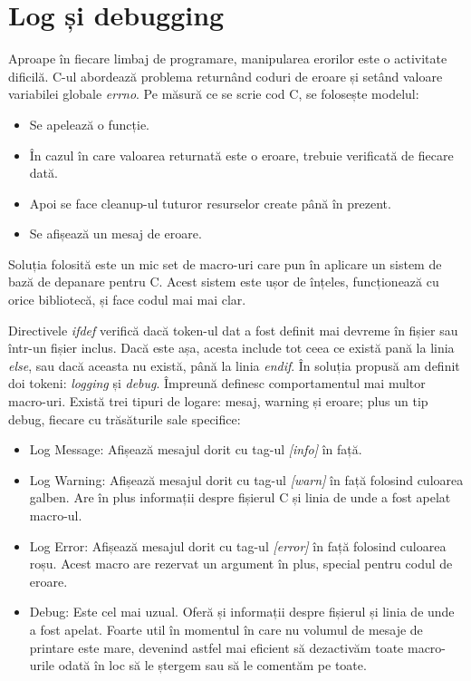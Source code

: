 

\section{Log și debugging}

Aproape în fiecare limbaj de programare, manipularea erorilor este o activitate dificilă. C-ul abordează problema returnând coduri de eroare și setând valoare variabilei globale \textit{errno}. Pe măsură ce se scrie cod C, se folosește modelul:

\begin{itemize}
  \item Se apelează o funcție.
  \item În cazul în care valoarea returnată este o eroare, trebuie verificată de fiecare dată.
  \item Apoi se face cleanup-ul tuturor resurselor create până în prezent.
  \item Se afișează un mesaj de eroare.
\end{itemize}

Soluția folosită este un mic set de macro-uri care pun în aplicare un sistem de bază de depanare pentru C. Acest sistem este ușor de înțeles, funcționează cu orice bibliotecă, și face codul mai mai clar.

Directivele \textit{ifdef} verifică dacă token-ul dat a fost definit mai devreme în fișier sau într-un fișier inclus. Dacă este așa, acesta include tot ceea ce există pană la linia \textit{else}, sau dacă aceasta nu există, până la linia \textit{endif}. În soluția propusă am definit doi tokeni: \textit{logging} și \textit{debug}. Împreună definesc comportamentul mai multor macro-uri. Există trei tipuri de logare: mesaj, warning și eroare; plus un tip debug, fiecare cu trăsăturile sale specifice:

\begin{itemize}
  \item Log Message: Afișează mesajul dorit cu tag-ul \textit{[info]} în față.
  \item Log Warning: Afișează mesajul dorit cu tag-ul \textit{[warn]} în față folosind culoarea galben. Are în plus informații despre fișierul C și linia de unde a fost apelat macro-ul.
  \item Log Error: Afișează mesajul dorit cu tag-ul \textit{[error]} în față folosind culoarea roșu. Acest macro are rezervat un argument în plus, special pentru codul de eroare.
  \item Debug: Este cel mai uzual. Oferă și informații despre fișierul și linia de unde a fost apelat. Foarte util în momentul în care nu volumul de mesaje de printare este mare, devenind astfel mai eficient să dezactivăm toate macro-urile odată în loc să le ștergem sau să le comentăm pe toate.
\end{itemize}